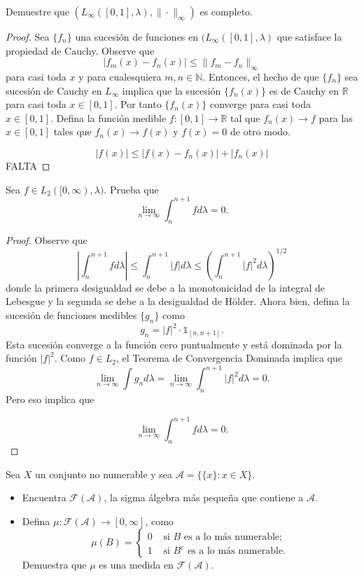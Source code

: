 \documentclass[12pt]{article}
\newcommand{\N}{\mathbb{N}}
\newcommand{\R}{\mathbb{R}}
\newenvironment{problem}[2][Problema]{\begin{trivlist}
\item[\hskip \labelsep {\bfseries #1}\hskip \labelsep {\bfseries #2.}]}{\end{trivlist}}
\begin{document}
\begin{problem}{20} Demuestre que $(L_\infty([0,1], \lambda), \| \cdot \|_\infty)$ es completo. 
\end{problem}
\begin{proof}
Sea $\{f_n\}$ una sucesión  de funciones en $(L_\infty([0,1], \lambda)$ que satisface la propiedad de Cauchy. Observe que
$$\lvert f_m(x) - f_n(x) \rvert \leq \| f_m - f_n \|_\infty$$
para casi toda $x$ y para cualesquiera $m,n \in \N$. Entonces, el hecho de que $\{f_n\}$ sea sucesión de Cauchy en $L_\infty$ implica que la sucesión $\{f_n(x)\}$ es de Cauchy en $\R$ para casi toda $x \in [0, 1]$. Por tanto $\{f_n(x)\}$ converge para casi toda $x \in [0, 1]$. Defina la función medible $f: [0, 1] \rightarrow \R$ tal que $f_n(x) \to f$ para las $x \in [0, 1]$ tales que $f_n(x) \to f(x)$ y $f(x) = 0$ de otro modo.


$$\lvert f(x) \rvert \leq \lvert f(x) - f_n(x) \rvert + \lvert f_n(x) \rvert $$ FALTA
\end{proof}


\begin{problem}{21} Sea $f \in L_2([0, \infty), \lambda)$. Prueba que $$\lim_{n \to \infty} \int_n^{n+1} f d\lambda = 0.$$
\end{problem}
\begin{proof}
    Observe que
    $$\left| \int_{n}^{n+1} f d\lambda \right|  \leq \int_{n}^{n+1} \lvert f \rvert d \lambda \leq  \left (\int_{n}^{n+1} \lvert f \rvert^2 d\lambda \right)^{1/2} $$
    donde la primera desigualdad se debe a la monotonicidad de la integral de Lebesgue y la segunda se debe a la desigualdad de Hölder. Ahora bien, defina la sucesión de funciones medibles $\{g_n\}$ como 
    $$g_n = \lvert f \rvert^2 \cdot \mathbb{1}_{[n, n+1]}.$$
    Esta sucesión converge a la función cero puntualmente y está dominada por la función $\lvert f \rvert^2$. Como $f \in L_2$, el Teorema de Convergencia Dominada implica que
    $$\lim_{n\to \infty} \int g_n d \lambda = \lim_{n \to \infty}  \int_{n}^{n+1} \lvert f \rvert^2 d\lambda = 0.$$
    Pero eso implica que
    
    $$\lim_{n \to \infty} \int_n^{n+1} f d\lambda =  0.$$
\end{proof}


\begin{problem}{22} Sea $X$ un conjunto no numerable y sea $\mathcal{A} = \{\{x\}: x \in X\}$.
\begin{itemize}
    \item[a)] Encuentra $\mathcal{F}(\mathcal{A})$, la sigma álgebra más pequeña que contiene a $\mathcal{A}$.
    \item[b)] Defina $\mu: \mathcal{F}(\mathcal{A}) \rightarrow [0, \infty]$, como 
    $$\mu(B) = \begin{cases}
        0 & \text{ si } B \text{ es a lo más numerable;}\\
        1 &  \text{ si } B^c \text{ es a lo más numerable.}
    \end{cases}$$
    Demuestra que $\mu$ es una medida en $\mathcal{F}(\mathcal{A})$.
\end{itemize}
\end{problem}
\end{document}
